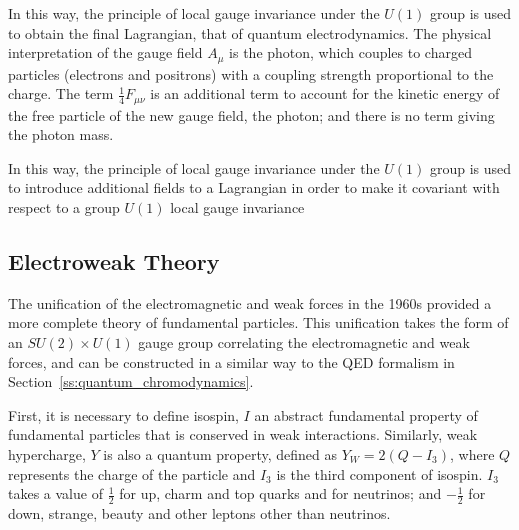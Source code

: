 In this way, the principle of local gauge invariance under the $U(1)$ group is used to obtain the final
Lagrangian, that of quantum electrodynamics. The physical interpretation of the gauge field $A_{\mu}$ is the
photon, which couples to charged particles (electrons and positrons) with a coupling strength proportional to
the charge. The term $\frac{1}{4}F_{\mu\nu}$ is an additional term to account for the kinetic energy of the
free particle of the new gauge field, \ie the photon; and there is no term giving the photon mass.


In this way, the principle of local gauge invariance under the $U(1)$ group is used to 
introduce additional
fields to a Lagrangian in order to make it covariant with respect to a group  $U(1)$ local gauge invariance

\subsection{Electroweak Theory}
\label{ss:electroweak_theory}

The unification of the electromagnetic and weak forces in the 1960s provided a more complete theory of
fundamental particles. This unification takes the form of an $SU(2) \times U(1)$ gauge group correlating the
electromagnetic and weak forces, and can be constructed in a similar way to the QED formalism in
Section~\ref{ss:quantum_chromodynamics}. 

First, it is necessary to define isospin, $I$ an abstract fundamental property of fundamental particles that
is conserved in weak interactions. Similarly, weak hypercharge, $Y$ is also a quantum property, defined as
$Y_{W} = 2(Q-I_{3})$, where $Q$ represents the charge of the particle and $I_{3}$ is the third component of
isospin. $I_{3}$ takes a value of $\frac{1}{2}$ for up, charm and top quarks and for neutrinos; and
$-\frac{1}{2}$ for down, strange, beauty and other leptons other than neutrinos.

